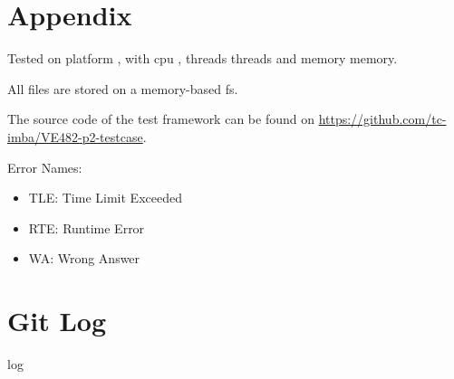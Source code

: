 \documentclass[landscape]{article}
\begin{document}
\section*{Appendix}

Tested on {{ platform }}, with {{ cpu }}, {{ threads }} threads and {{ memory }} memory.

All files are stored on a memory-based fs.

The source code of the test framework can be found on \url{https://github.com/tc-imba/VE482-p2-testcase}. \bigskip

Error Names:
\begin{itemize}
\item {\color{red}TLE}: Time Limit Exceeded
\item {\color{red}RTE}: Runtime Error
\item {\color{red}WA}: Wrong Answer
\end{itemize}

\section*{Git Log}

\begin{multicols}{2}
{{ log }}
\end{multicols}
\end{document}
